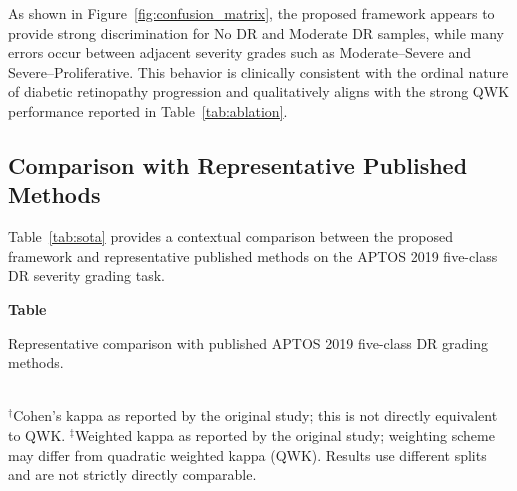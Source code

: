 \documentclass[a4paper,fleqn]{cas-dc}
\newcommand{\lefttablecaption}[2]{%
  \refstepcounter{table}\label{#1}%
  {\raggedright
  \textbf{Table~\thetable}\par\vspace{-2pt}
  #2\par}
}
\begin{document}
As shown in Figure~\ref{fig:confusion_matrix}, the proposed framework appears to provide strong discrimination for No DR and Moderate DR samples, while many errors occur between adjacent severity grades such as Moderate--Severe and Severe--Proliferative. This behavior is clinically consistent with the ordinal nature of diabetic retinopathy progression and qualitatively aligns with the strong QWK performance reported in Table~\ref{tab:ablation}.

\FloatBarrier

\subsection{Comparison with Representative Published Methods}

Table~\ref{tab:sota} provides a contextual comparison between the proposed framework and representative published methods on the APTOS 2019 five-class DR severity grading task.

\begin{table}[width=\textwidth,pos=t]
\raggedright
\lefttablecaption{tab:sota}{Representative comparison with published APTOS 2019 five-class DR grading methods.}
\small
{}
\medskip\\
{\footnotesize $^{\dag}$Cohen's kappa as reported by the original study; this is not directly equivalent to QWK. $^{\ddag}$Weighted kappa as reported by the original study; weighting scheme may differ from quadratic weighted kappa (QWK). Results use different splits and are not strictly directly comparable.}
\end{table}
\end{document}
